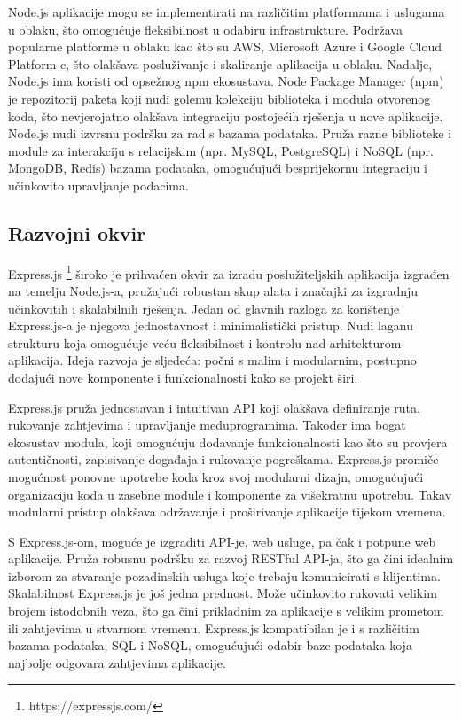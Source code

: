 \documentclass[times, utf8, diplomski]{fer}
\begin{document}
Node.js aplikacije mogu se implementirati na različitim platformama i uslugama u oblaku, što omogućuje fleksibilnost u odabiru infrastrukture. Podržava popularne platforme u oblaku kao što su AWS, Microsoft Azure i Google Cloud Platform-e, što olakšava posluživanje i skaliranje aplikacija u oblaku. Nadalje, Node.js ima koristi od opsežnog npm ekosustava. Node Package Manager (npm) je repozitorij paketa koji nudi golemu kolekciju biblioteka i modula otvorenog koda, što nevjerojatno olakšava integraciju postojećih rješenja u nove aplikacije. Node.js nudi izvrsnu podršku za rad s bazama podataka. Pruža razne biblioteke i module za interakciju s relacijskim (npr. MySQL, PostgreSQL) i NoSQL (npr. MongoDB, Redis) bazama podataka, omogućujući besprijekornu integraciju i učinkovito upravljanje podacima.

\subsection{Razvojni okvir}

Express.js \footnote{https://expressjs.com/} široko je prihvaćen okvir za izradu poslužiteljskih aplikacija izgrađen na temelju Node.js-a, pružajući robustan skup alata i značajki za izgradnju učinkovitih i skalabilnih rješenja. Jedan od glavnih razloga za korištenje Express.js-a je njegova jednostavnost i minimalistički pristup. Nudi laganu strukturu koja omogućuje veću fleksibilnost i kontrolu nad arhitekturom aplikacija. Ideja razvoja je sljedeća: počni s malim i modularnim, postupno dodajući nove komponente i funkcionalnosti kako se projekt širi.

Express.js pruža jednostavan i intuitivan API koji olakšava definiranje ruta, rukovanje zahtjevima i upravljanje međuprogramima. Također ima bogat ekosustav modula, koji omogućuju dodavanje funkcionalnosti kao što su provjera autentičnosti, zapisivanje događaja i rukovanje pogreškama. Express.js promiče mogućnost ponovne upotrebe koda kroz svoj modularni dizajn, omogućujući organizaciju koda u zasebne module i komponente za višekratnu upotrebu. Takav modularni pristup olakšava održavanje i proširivanje aplikacije tijekom vremena. 

S Express.js-om, moguće je izgraditi API-je, web usluge, pa čak i potpune web aplikacije. Pruža robusnu podršku za razvoj RESTful API-ja, što ga čini idealnim izborom za stvaranje pozadinskih usluga koje trebaju komunicirati s klijentima. Skalabilnost Express.js je još jedna prednost. Može učinkovito rukovati velikim brojem istodobnih veza, što ga čini prikladnim za aplikacije s velikim prometom ili zahtjevima u stvarnom vremenu. Express.js kompatibilan je i s različitim bazama podataka, SQL i NoSQL, omogućujući odabir baze podataka koja najbolje odgovara zahtjevima aplikacije.
\end{document}
